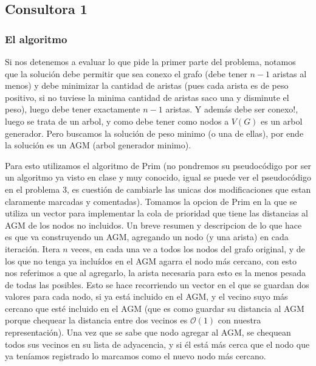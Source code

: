 \documentclass[A4paper,oneside,fleqn,11pt]{article}
\theoremstyle{definition}
\begin{document}
\subsection{Consultora 1}

\subsubsection{El algoritmo}
Si nos detenemos a evaluar lo que pide la primer parte del problema, notamos que la solución debe permitir que sea conexo el grafo (debe tener $n-1$ aristas al menos) y debe minimizar la cantidad de aristas (pues cada arista es de peso positivo, si no tuviese la minima cantidad de aristas saco una y disminute el peso), luego debe tener exactamente $n-1$ aristas. Y además debe ser conexo!, luego se trata de un arbol, y como debe tener como nodos a $V(G)$ es un arbol generador. Pero buscamos la solución de peso minimo (o una de ellas), por ende la solución es un AGM (arbol generador minimo). 

Para esto utilizamos el algoritmo de Prim (no pondremos su pseudocódigo por ser un algoritmo ya visto en clase y muy conocido, igual se puede ver el pseudocódigo en el problema 3, es cuestión de cambiarle las unicas dos modificaciones que estan claramente marcadas y comentadas). Tomamos la opcion de Prim en la que se utiliza un vector para implementar la cola de prioridad que tiene las distancias al AGM de los nodos no incluidos. Un breve resumen y descripcion de lo que hace es que va construyendo un AGM, agregando un nodo (y una arista) en cada iteración. Itera $n$ veces, en cada una ve a todos los nodos del grafo original, y de los que no tenga ya incluídos en el AGM agarra el nodo más cercano, con esto nos referimos a que al agregarlo, la arista necesaria para esto es la menos pesada de todas las posibles. Esto se hace recorriendo un vector en el que se guardan dos valores para cada nodo, si ya está incluido en el AGM, y el vecino suyo más cercano que esté incluido en el AGM (que es como guardar su distancia al AGM porque chequear la distancia entre dos vecinos es $\mathcal{O} (1)$ con nuestra representación). Una vez que se sabe que nodo agregar al AGM, se chequean todos sus vecinos en su lista de adyacencia, y si él está más cerca que el nodo que ya teníamos registrado lo marcamos como el nuevo nodo más cercano.
\end{document}

